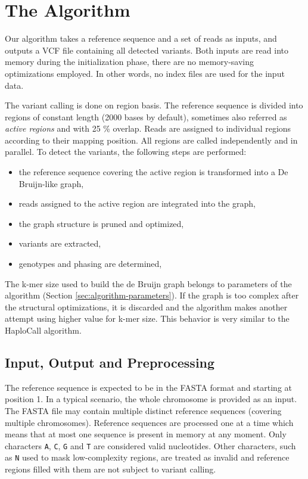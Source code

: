 ﻿\chapter{The Algorithm}
\label{chap:the-algorithm}

Our algorithm takes a reference sequence and a set of reads as inputs, and outputs a VCF file containing all detected variants. Both inputs are read into memory during the initialization phase, there are no memory-saving optimizations employed. In other words, no index files are used for the input data.

The variant calling is done on region basis. The reference sequence is divided into regions of constant length (2000 bases by default), sometimes also referred as \textit{active regions} and with 25 \% overlap. Reads are assigned to individual regions according to their mapping position. All regions are called independently and in parallel. To detect the variants, the following steps are performed:
\begin{itemize}
\item the reference sequence covering the active region is transformed into a De Bruijn-like graph,
\item reads assigned to the active region are integrated into the graph,
\item the graph structure is pruned and optimized,
\item variants are extracted,
\item genotypes and phasing are determined,
\end{itemize}

The k-mer size used to build the de Bruijn graph belongs to parameters of the algorithm (Section \ref{sec:algorithm-parameters}). If the graph is too complex after the structural optimizations, it is discarded and the algorithm makes another attempt using higher value for k-mer size. This behavior is very similar to the HaploCall algorithm.

\section{Input, Output and Preprocessing}
\label{sec:input-output-and-preprocessing}

The reference sequence is expected to be in the FASTA format and starting at position 1. In a typical scenario, the whole chromosome is provided as an input. The FASTA file may contain multiple distinct reference sequences (covering multiple chromosomes). Reference sequences are processed one at a time which means that at most one sequence is present in memory at any moment. Only characters \texttt{A}, \texttt{C}, \texttt{G} and \texttt{T} are considered valid nucleotides. Other characters, such as \texttt{N} used to mask low-complexity regions, are treated as invalid and reference regions filled with them are not subject to variant calling.

